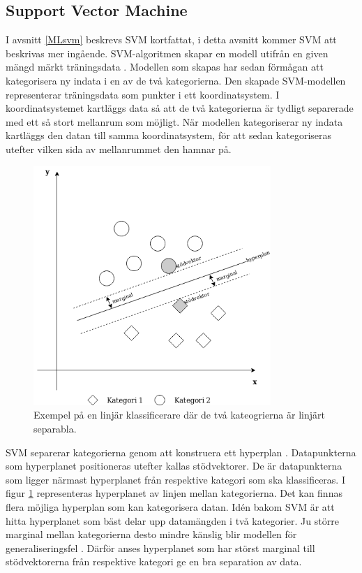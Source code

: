 \documentclass{kaumasters} %
\begin{document}
\subsection{Support Vector Machine}
I avsnitt \ref{MLsvm} beskrevs SVM kortfattat, i detta avsnitt kommer SVM att beskrivas mer ingående. SVM-algoritmen skapar en modell utifrån en given mängd märkt träningsdata \cite{svm:002}. Modellen som skapas har sedan förmågan att kategorisera ny indata i en av de två kategorierna. Den skapade SVM-modellen representerar träningsdata som punkter i ett koordinatsystem. I koordinatsystemet kartläggs data så att de två kategorierna är tydligt separerade med ett så stort mellanrum som möjligt. När modellen kategoriserar ny indata kartläggs den datan till samma koordinatsystem, för att sedan kategoriseras utefter vilken sida av mellanrummet den hamnar på.

\begin{figure}[H]
\includegraphics[width=9cm]{linearsvm_hpwithmargins}
\centering
\caption{Exempel på en linjär klassificerare där de två kateogrierna är linjärt separabla.}
\label{fig:svmmarg}
\end{figure}  

SVM separerar kategorierna genom att konstruera ett hyperplan \cite{svm:003}. Datapunkterna som hyperplanet positioneras utefter kallas stödvektorer. De är datapunkterna som ligger närmast hyperplanet från respektive kategori som ska klassificeras. I figur \ref{fig:svmmarg} representeras hyperplanet av linjen mellan kategorierna. Det kan finnas flera möjliga hyperplan som kan kategorisera datan. Idén bakom SVM är att hitta hyperplanet som bäst delar upp datamängden i två kategorier. Ju större marginal mellan kategorierna desto mindre känslig blir modellen för generaliseringsfel \cite{svm:002}. Därför anses hyperplanet som har störst marginal till stödvektorerna från respektive kategori ge en bra separation av data.
\end{document}
